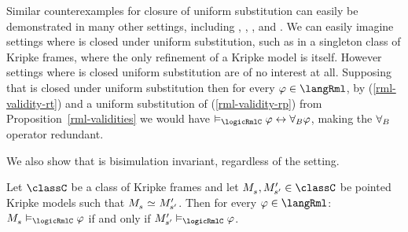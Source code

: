 Similar counterexamples for closure of uniform substitution can easily be demonstrated in many other settings, including \classKF{}, \classKFF{}, \classKD{}, and \classS{}.
We can easily imagine settings where \logicRml{} is closed under uniform substitution, such as in a singleton class of Kripke frames, where the only refinement of a Kripke model is itself.
However settings where \logicRml{} is closed uniform substitution are of no interest at all.
Supposing that \logicRmlC{} is closed under uniform substitution then for every $\phi \in \langRml$, by (\ref{rml-validity-rt}) and a uniform substitution of (\ref{rml-validity-rp}) from Proposition~\ref{rml-validities} we would have $\entails_\logicRmlC \phi \iff \allrefsBs \phi$, making the ${\forall_{B}}$ operator redundant.

We also show that \logicRml{} is bisimulation invariant, regardless of the setting.

\begin{proposition}\label{rml-bisimulation-invariance}
Let $\classC$ be a class of Kripke frames and let $\kPModel{\kStateS}, \kPModelP{\kStateSP} \in \classC$ be pointed Kripke models such that $\kPModel{\kStateS} \bisimilar \kPModelP{\kStateSP}$.
Then for every $\phi \in \langRml$:
$\kPModel{\kStateS} \entails_\logicRmlC \phi$ if and only if $\kPModelP{\kStateSP} \entails_\logicRmlC \phi$.
\end{proposition}

